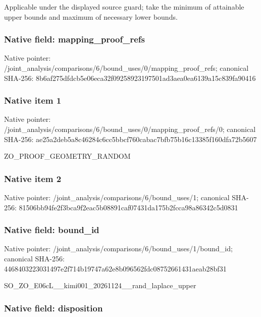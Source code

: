 \documentclass[10pt,a4paper]{article}
\begin{document}
Applicable under the displayed source guard; take the minimum of attainable upper bounds and maximum of necessary lower bounds.


\subsubsection{Native field: mapping\_proof\_refs}


Native pointer: /joint\_analysis/comparis\allowbreak{}ons/6/bound\_uses/0/mappi\allowbreak{}ng\_proof\_refs; canonical SHA-256: 8b6af275dfdcb5e06eca32f0\allowbreak{}9258923197501ad3aea0ea61\allowbreak{}39a15c839fa90416



\subsubsection{Native item 1}


Native pointer: /joint\_analysis/comparis\allowbreak{}ons/6/bound\_uses/0/mappi\allowbreak{}ng\_proof\_refs/0; canonical SHA-256: ae25a2deb5a8c46284c6cc5b\allowbreak{}bcf760cabac7bfb75b16c133\allowbreak{}85f160dfa72b5607


ZO\_PROOF\_GEOMETRY\_RANDOM


\subsubsection{Native item 2}


Native pointer: /joint\_analysis/comparis\allowbreak{}ons/6/bound\_uses/1; canonical SHA-256: 81506bb94fe2f3bca9f2eac5\allowbreak{}b08891caf07431da175b2fcc\allowbreak{}a98a86342c5d0831



\subsubsection{Native field: bound\_id}


Native pointer: /joint\_analysis/comparis\allowbreak{}ons/6/bound\_uses/1/bound\allowbreak{}\_id; canonical SHA-256: 4468403223031497e2f714b1\allowbreak{}9747a62e8b096562fdc08752\allowbreak{}661431aeab28bf31


SO\_ZO\_E06cL\_\_kimi001\_202\allowbreak{}61124\_\_rand\_laplace\_uppe\allowbreak{}r


\subsubsection{Native field: disposition}
\end{document}
